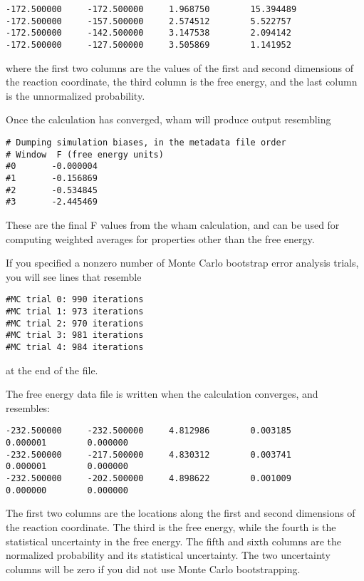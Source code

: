 \documentclass[12pt]{article}
\begin{document}
\begin{verbatim}
-172.500000     -172.500000     1.968750        15.394489
-172.500000     -157.500000     2.574512        5.522757
-172.500000     -142.500000     3.147538        2.094142
-172.500000     -127.500000     3.505869        1.141952
\end{verbatim}
where the first two columns are the values of the first and second
dimensions of the reaction coordinate, the third column is the free energy, and
the last column is the unnormalized probability.

Once the calculation has converged, wham will produce output resembling

\begin{verbatim}
# Dumping simulation biases, in the metadata file order
# Window  F (free energy units)
#0       -0.000004
#1       -0.156869
#2       -0.534845
#3       -2.445469
\end{verbatim}

These are the final F values from the wham calculation, and can be used for
computing weighted averages for properties other than the free energy.

If you specified a nonzero number of Monte Carlo bootstrap error analysis
trials, you will see lines that resemble

\begin{verbatim}
#MC trial 0: 990 iterations
#MC trial 1: 973 iterations
#MC trial 2: 970 iterations
#MC trial 3: 981 iterations
#MC trial 4: 984 iterations
\end{verbatim}
at the end of the file.

The free energy data file is written when the calculation converges, and
resembles:

\begin{footnotesize}
\begin{verbatim}
-232.500000     -232.500000     4.812986        0.003185        0.000001        0.000000
-232.500000     -217.500000     4.830312        0.003741        0.000001        0.000000
-232.500000     -202.500000     4.898622        0.001009        0.000000        0.000000
\end{verbatim}
\end{footnotesize}


The first two columns are the locations along the first and second
dimensions of the reaction coordinate.  The third is the free energy, while
the fourth is the statistical uncertainty in the free energy.  The fifth
and sixth columns are the normalized probability and its statistical
uncertainty.  The two uncertainty columns will be zero if you did not use
Monte Carlo bootstrapping.
\end{document}
